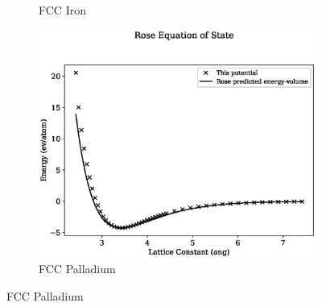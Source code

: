 \begin{figure}[htb]
\begin{subfigure}{.32\textwidth}
  \caption{FCC Iron}
  \label{fig:sub-first}
\end{subfigure}
\begin{subfigure}{.32\textwidth}
  \centering
  \includegraphics[width=.94\linewidth]{chapters/potentials_fe_pd_ru/fepd_potential/rose_plot_bp_1.eps}  
  \caption{FCC Palladium}
  \label{fig:sub-first}
\end{subfigure}

\label{fig:binaryalloyconfigurationsbulk}
\end{figure}





















































